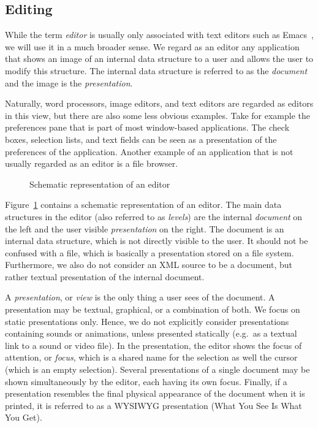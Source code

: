 \subsection{Editing}
\label{sect:editing}


While the term {\em editor} is usually only associated with text editors such as Emacs~\cite{stallman81emacs}, we will use it in a much broader sense. We regard as an editor any application that shows an image of an internal data structure to a user and allows the user to modify this structure. The internal data structure is referred to as the {\em document} and the image is the {\em presentation}. 

Naturally, word processors, image editors, and text editors are regarded as editors in this view, but there are also some less obvious examples. Take for example the preferences pane that is part of most window-based applications. The check boxes, selection lists, and text fields can be seen as a presentation of the preferences of the application. Another example of an application that is not usually regarded as an editor is a file browser.


\begin{figure}
\begin{small}
\begin{center}
\begin{center}
\end{center}\caption{Schematic representation of an editor}\label{editor} 
\end{center}
\end{small}
\end{figure}

Figure~\ref{editor} contains a schematic representation of an editor. The main data structures in the editor (also referred to as {\em levels}) are the internal {\em document} on the left and the user visible {\em presentation} on the right. The document is an internal data structure, which is not directly visible to the user. It should not be confused with a file, which is basically a presentation stored on a file system. Furthermore, we also do not consider an XML source to be a document, but rather textual presentation of the internal document.

A {\em presentation}, or {\em view} is the only thing a user sees of the document. A presentation may be textual, graphical, or a combination of both. We focus on static presentations only. Hence, we do not explicitly consider presentations containing sounds or animations, unless presented statically (e.g.\ as a textual link to a sound or video file). In the presentation, the editor shows the focus of attention, or {\em focus}, which is a shared name for the selection as well the cursor (which is an empty selection).  Several presentations of a single document may be shown simultaneously by the editor, each having its own focus. Finally, if a presentation resembles the final physical appearance of the document when it is printed, it is referred to as a WYSIWYG presentation (What You See Is What You Get).

